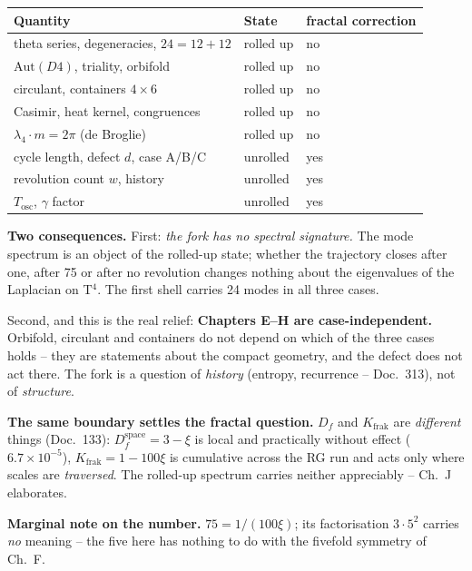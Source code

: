 \begin{center}
\begin{tabular}{lll}
\toprule
Quantity & State & fractal correction \\
\midrule
theta series, degeneracies, $24 = 12+12$ & rolled up & no \\
$\text{Aut}(D4)$, triality, orbifold & rolled up & no \\
circulant, containers $4\times6$ & rolled up & no \\
Casimir, heat kernel, congruences & rolled up & no \\
$\lambda_4\cdot m = 2\pi$ (de Broglie) & rolled up & no \\
\midrule
cycle length, defect $d$, case A/B/C & unrolled & yes \\
revolution count $w$, history & unrolled & yes \\
$T_\text{osc}$, $\gamma$ factor & unrolled & yes \\
\bottomrule
\end{tabular}
\end{center}

\textbf{Two consequences.} First: \emph{the fork has no spectral
signature.} The mode spectrum is an object of the rolled-up state;
whether the trajectory closes after one, after 75 or after no
revolution changes nothing about the eigenvalues of the Laplacian
on T$^4$. The first shell carries 24 modes in all three cases.

Second, and this is the real relief: \textbf{Chapters E--H are
case-independent.} Orbifold, circulant and containers do not
depend on which of the three cases holds -- they are statements
about the compact geometry, and the defect does not act there. The
fork is a question of \emph{history} (entropy, recurrence --
Doc.~313), not of \emph{structure}.

\textbf{The same boundary settles the fractal question.} $D_f$ and
$K_\text{frak}$ are \emph{different} things (Doc.~133):
$D_f^\text{space} = 3-\xi$ is local and practically without effect
($6.7\times10^{-5}$), $K_\text{frak} = 1-100\xi$ is cumulative
across the RG run and acts only where scales are \emph{traversed}.
The rolled-up spectrum carries neither appreciably -- Ch.~J
elaborates.

\textbf{Marginal note on the number.} $75 = 1/(100\xi)$; its
factorisation $3\cdot5^2$ carries \emph{no} meaning -- the five
here has nothing to do with the fivefold symmetry of Ch.~F.

